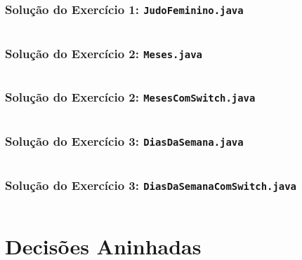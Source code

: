 \documentclass[xcolor={dvipsnames,table},aspectratio=169]{beamer}
\begin{document}
\begin{frame}\frametitle{Solução do Exercício 1: \texttt{JudoFeminino.java}}
	\scriptsize{\inputminted[bgcolor=cyan!10]{java}{src/JudoFeminino.java}}
\end{frame}

\begin{frame}\frametitle{Solução do Exercício 2: \texttt{Meses.java}}
	\tiny{\inputminted[bgcolor=cyan!10]{java}{src/Meses.java}}
\end{frame}

\begin{frame}\frametitle{Solução do Exercício 2: \texttt{MesesComSwitch.java}}
	\tiny{\inputminted[bgcolor=cyan!10]{java}{src/MesesComSwitch.java}}
\end{frame}

\begin{frame}\frametitle{Solução do Exercício 3: \texttt{DiasDaSemana.java}}
	\scriptsize{\inputminted[bgcolor=cyan!10]{java}{src/DiasDaSemana.java}}
\end{frame}

\begin{frame}\frametitle{Solução do Exercício 3: \texttt{DiasDaSemanaComSwitch.java}}
	\tiny{\inputminted[bgcolor=cyan!10]{java}{src/DiasDaSemanaComSwitch.java}}
\end{frame}

\section{Decisões Aninhadas}
\end{document}
